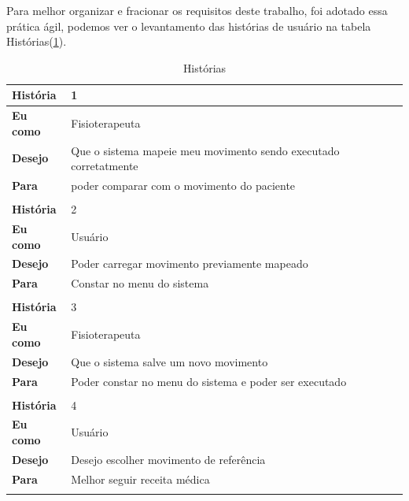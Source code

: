  Para melhor organizar e fracionar os requisitos deste trabalho, foi adotado
essa prática ágil, podemos ver o levantamento das histórias de usuário na tabela Histórias(\ref{historias}).
\begin{table}[H]
\centering
\caption{Histórias}
\label{historias}
\begin{tabular}{|l|l|}
\hline
\textbf{História} & 1                                                        \\ \hline
\textbf{Eu como}  & Fisioterapeuta                    \\ \hline
\textbf{Desejo}   & Que o sistema mapeie meu movimento sendo executado corretatmente                   \\ \hline
\textbf{Para}     & poder comparar com o movimento do paciente \\ \hline
 \multicolumn{2}{|l|}{}                                                       \\ \hline
\textbf{História} & 2                                                        \\ \hline
\textbf{Eu como}  & Usuário                                    \\ \hline
\textbf{Desejo}   & Poder carregar movimento previamente mapeado                \\ \hline
\textbf{Para}     & Constar no menu do sistema\\ \hline
\multicolumn{2}{|l|}{}                                                       \\ \hline
\textbf{História} & 3                                                        \\ \hline
\textbf{Eu como}  & Fisioterapeuta                    \\ \hline
\textbf{Desejo}   & Que o sistema salve um novo movimento                    \\ \hline
\textbf{Para}     & Poder constar no menu do sistema e poder ser executado \\ \hline
\multicolumn{2}{|l|}{}                                                       \\ \hline
\textbf{História} & 4                                                        \\ \hline
\textbf{Eu como}  & Usuário                                                  \\ \hline
\textbf{Desejo}   & Desejo escolher movimento de referência                  \\ \hline
\textbf{Para}     & Melhor seguir receita médica                             \\ \hline
\multicolumn{2}{|l|}{}                                                       \\ \hline


\end{tabular}
\end{table}
